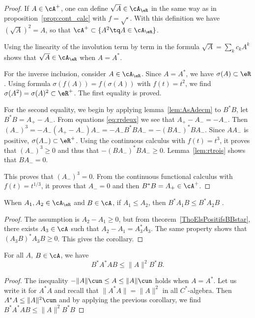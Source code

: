 \begin{proof}
If $A\in\cA^+$, one can define $\sqrt{A}\in\cA_{\eR}$ in the same way as in proposition~\ref{prop:cont_calc} with $f=\sqrt{\cdot}$. With this definition we have $(\sqrt{A})^2=A$, so that $\cA^+\subset\{ A^2\tq A\in\cA_{\eR} \}$.

Using the linearity of the involution term by term in the formula $\sqrt{A}=\sum_k c_kA^k$ shows that $\sqrt{A}\in\cA_{\eR}$ when $A=A^*$.

For the inverse inclusion, consider $A\in\cA_{\eR}$. Since $A=A^*$, we have $\sigma(A)\subset\eR$. Using formula $\sigma(f(A))=f(\sigma(A))$ with $f(t)=t^2$, we find $\sigma(A^2)=\sigma(A)^2\subset\eR^+$. The first equality is proved.

For the second equality, we begin by applying lemma~\ref{lem:AsAdecm} to $B^*B$, let $B^*B=A_+-A_-$. From equations \eqref{eq:rrdeux} we see that $A_+-A_-=-A_-$. Then $(A_-)^3=-A_-(A_+-A_-)A_-=-A_-B^*BA_-=-(BA_-)^*BA_-$. Since $AA_-$ is positive, $\sigma(A_-)\subset\eR^+$. Using the continuous calculus with $f(t)=t^3$, it proves that $(A_-)^3\geq 0$ and thus that $-(BA_-)^*BA_-\geq 0$. Lemma~\ref{lem:rtrois} shows that $BA_-=0$.

This proves that $(A_-)^3=0$. From the continuous functional calculus with $f(t)=t^{1/3}$, it proves that $A_-=0$ and then $B^*B=A_+\in\cA^+$.
\end{proof}
\begin{corollary}
When $A_1,A_2\in\cA_{\eR}$ and $B\in\cA$, if $A_1\leq A_2$, then $B^*A_1B\leq B^*A_2B$ .
\end{corollary}

\begin{proof}
The assumption is $A_2-A_1\geq 0$, but from theorem~\ref{ThoElsPositifsBBstar}, there exists $A_3\in\cA$ such that $A_2-A_1=A^*_3A_3$. The same property shows that $(A_3B)^*A_3B\geq 0$. This gives the corollary.
\end{proof}


\begin{corollary}
For all $A$, $B\in\cA$, we have
\[
  B^*A^*AB\leq \| A \|^2B^*B.
\]
 \label{cor:BeAAeB}
\end{corollary}

\begin{proof}
The inequality $-\| A \|\cun\leq A\leq \| A \|\cun$ holds when $A=A^*$. Let us write it for $A^*A$ and recall that $\| A^*A \|=\| A \|^2$ in all $C^*$-algebra. Then $A^*A\leq \| A \|^2\cun$ and by applying the previous corollary, we find $B^*A^*AB\leq\| A \|^2B^*B$
\end{proof}



